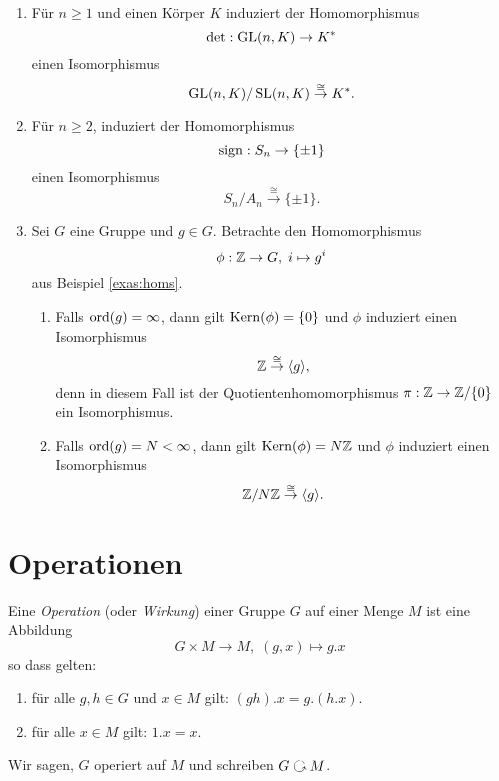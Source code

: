\documentclass{book}
\begin{document}
\begin{exas}
    \label{exas:homsatz}
    \begin{enumerate}
        \item Für $n \ge 1$ und einen Körper $K$ induziert der Homomorphismus 
            \[
                \det: \operatorname{GL}(n,K) \to K^*
            \]
            einen Isomorphismus
            \[
                \operatorname{GL}(n,K)/\operatorname{SL}(n,K) \overset{\cong}{\to} K^*.
            \]
        \item Für $n \ge 2$, induziert der Homomorphismus
            \[
                \operatorname{sign}: S_n \to \{\pm 1\}
            \]
            einen Isomorphismus
            \[
                S_n/A_n \overset{\cong}{\to} \{ \pm 1\}.
            \]
        \item Sei $G$ eine Gruppe und $g \in G$. Betrachte den Homomorphismus
            \[
                \phi: \ZZ \to G,\; i \mapsto g^i
            \]
            aus Beispiel \ref{exas:homs}.
            \begin{enumerate}
                \item Falls $\operatorname{ord}(g) = \infty$, dann gilt $\Kern(\phi) = \{0\}$ und $\phi$ induziert einen Isomorphismus
                    \[
                        \mathbb{Z} \overset{\cong}{\to} \langle g \rangle ,
                    \]
                    denn in diesem Fall ist der Quotientenhomomorphismus $\pi: \mathbb{Z} \to \mathbb{Z}/ \{0\}$ ein Isomorphismus.
                \item Falls $\operatorname{ord}(g) = N < \infty$, dann gilt $\Kern(\phi) = N \ZZ$ und $\phi$ induziert einen Isomorphismus
                    \[
                        \mathbb{Z}/N\mathbb{Z} \overset{\cong}{\to} \langle g \rangle .
                    \]
            \end{enumerate}
    \end{enumerate}
\end{exas}

\section{Operationen}%
\label{sec:operationen}

\begin{defi}
    \label{defi:operation}
    Eine \emph{Operation} (oder \emph{Wirkung}) einer Gruppe $G$ auf einer Menge $M$ ist eine Abbildung 
    \[
        G \times M \to M,\; (g,x) \mapsto g.x 
    \]
    so dass gelten:
    \begin{enumerate}
        \item für alle $g, h \in G$ und $x \in M$ gilt: $(gh).x = g.(h.x)$.
        \item für alle $x \in M$ gilt: $1.x = x$. 
    \end{enumerate}
    Wir sagen, $G$ operiert auf $M$ und schreiben $G \actson M$. 
\end{defi}
\end{document}

